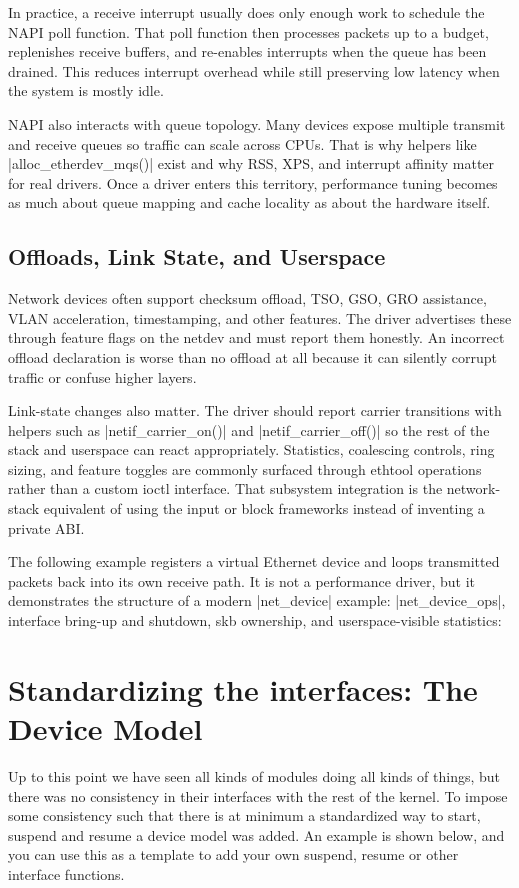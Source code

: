 \documentclass[10pt, oneside]{book}
\begin{document}
In practice, a receive interrupt usually does only enough work to schedule the
NAPI poll function.
That poll function then processes packets up to a budget, replenishes receive
buffers, and re-enables interrupts when the queue has been drained.
This reduces interrupt overhead while still preserving low latency when the
system is mostly idle.

NAPI also interacts with queue topology.
Many devices expose multiple transmit and receive queues so traffic can scale
across CPUs.
That is why helpers like \cpp|alloc_etherdev_mqs()| exist and why RSS, XPS, and
interrupt affinity matter for real drivers.
Once a driver enters this territory, performance tuning becomes as much about
queue mapping and cache locality as about the hardware itself.

\subsection{Offloads, Link State, and Userspace}
\label{sec:net_offloads}
Network devices often support checksum offload, TSO, GSO, GRO assistance, VLAN
acceleration, timestamping, and other features.
The driver advertises these through feature flags on the netdev and must report
them honestly.
An incorrect offload declaration is worse than no offload at all because it can
silently corrupt traffic or confuse higher layers.

Link-state changes also matter.
The driver should report carrier transitions with helpers such as
\cpp|netif_carrier_on()| and \cpp|netif_carrier_off()| so the rest of the stack
and userspace can react appropriately.
Statistics, coalescing controls, ring sizing, and feature toggles are commonly
surfaced through ethtool operations rather than a custom ioctl interface.
That subsystem integration is the network-stack equivalent of using the input or
block frameworks instead of inventing a private ABI.

The following example registers a virtual Ethernet device and loops transmitted
packets back into its own receive path.
It is not a performance driver, but it demonstrates the structure of a modern
\cpp|net_device| example: \cpp|net_device_ops|, interface bring-up and shutdown,
skb ownership, and userspace-visible statistics:


\section{Standardizing the interfaces: The Device Model}
\label{sec:device_model}
Up to this point we have seen all kinds of modules doing all kinds of things, but there was no consistency in their interfaces with the rest of the kernel.
To impose some consistency such that there is at minimum a standardized way to start, suspend and resume a device model was added.
An example is shown below, and you can use this as a template to add your own suspend, resume or other interface functions.
\end{document}

